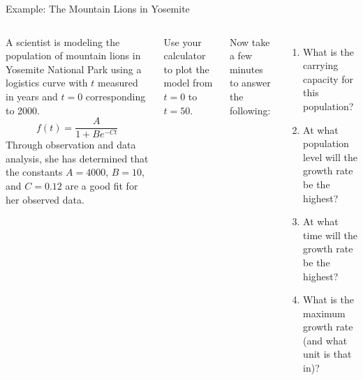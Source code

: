 \documentclass[10pt,aspectratio=1610,xcolor={dvipsnames}]{beamer}
\begin{document}
  \begin{frame}{Example: The Mountain Lions in Yosemite}

    \begin{columns}

      A scientist is modeling the population of mountain lions in Yosemite National Park using a logistics curve with $t$ measured in years and $t=0$ corresponding to 2000.
      \[
        f(t) = \frac{A}{1 + Be^{-Ct}}
      \]
      Through observation and data analysis, she has determined that the constants $A = 4000$, $B = 10$, and $C = 0.12$ are a good fit for her observed data.

      Use your calculator to plot the model from $t = 0$ to $t = 50$.

      Now take a few minutes to answer the following:

      \begin{enumerate}
        \item{What is the carrying capacity for this population?}
        \item{At what population level will the growth rate be the highest?}
        \item{At what time will the growth rate be the highest?}
        \item{What is the maximum growth rate (and what unit is that in)?}
      \end{enumerate}

    \end{columns}

  \end{frame}
\end{document}
